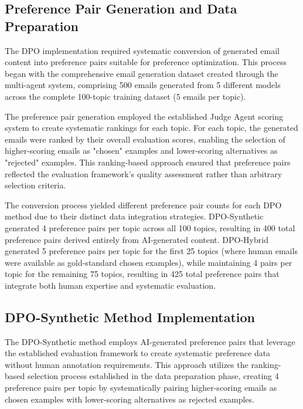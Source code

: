 \subsection{Preference Pair Generation and Data Preparation}

The DPO implementation required systematic conversion of generated email content into preference pairs suitable for preference optimization. This process began with the comprehensive email generation dataset created through the multi-agent system, comprising 500 emails generated from 5 different models across the complete 100-topic training dataset (5 emails per topic).

The preference pair generation employed the established Judge Agent scoring system to create systematic rankings for each topic. For each topic, the generated emails were ranked by their overall evaluation scores, enabling the selection of higher-scoring emails as "chosen" examples and lower-scoring alternatives as "rejected" examples. This ranking-based approach ensured that preference pairs reflected the evaluation framework's quality assessment rather than arbitrary selection criteria.

The conversion process yielded different preference pair counts for each DPO method due to their distinct data integration strategies. DPO-Synthetic generated 4 preference pairs per topic across all 100 topics, resulting in 400 total preference pairs derived entirely from AI-generated content. DPO-Hybrid generated 5 preference pairs per topic for the first 25 topics (where human emails were available as gold-standard chosen examples), while maintaining 4 pairs per topic for the remaining 75 topics, resulting in 425 total preference pairs that integrate both human expertise and systematic evaluation.

\subsection{DPO-Synthetic Method Implementation}

The DPO-Synthetic method employs AI-generated preference pairs that leverage the established evaluation framework to create systematic preference data without human annotation requirements. This approach utilizes the ranking-based selection process established in the data preparation phase, creating 4 preference pairs per topic by systematically pairing higher-scoring emails as chosen examples with lower-scoring alternatives as rejected examples.

